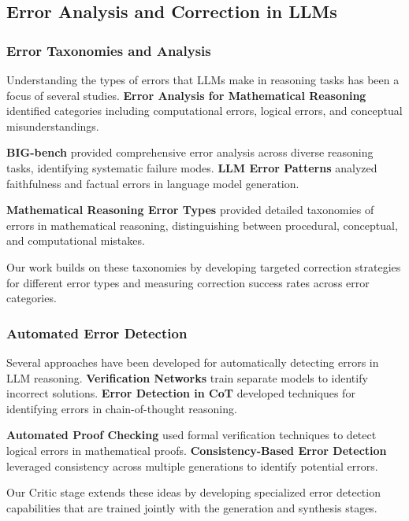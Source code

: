 \documentclass[10pt,twocolumn]{article}
\begin{document}
\subsection{Error Analysis and Correction in LLMs}

\subsubsection{Error Taxonomies and Analysis}

Understanding the types of errors that LLMs make in reasoning tasks has been a focus of several studies. \textbf{Error Analysis for Mathematical Reasoning} \cite{wells2021error} identified categories including computational errors, logical errors, and conceptual misunderstandings.

\textbf{BIG-bench} \cite{srivastava2022beyond} provided comprehensive error analysis across diverse reasoning tasks, identifying systematic failure modes. \textbf{LLM Error Patterns} \cite{dziri2023faith} analyzed faithfulness and factual errors in language model generation.

\textbf{Mathematical Reasoning Error Types} \cite{frieder2023mathematical} provided detailed taxonomies of errors in mathematical reasoning, distinguishing between procedural, conceptual, and computational mistakes.

Our work builds on these taxonomies by developing targeted correction strategies for different error types and measuring correction success rates across error categories.

\subsubsection{Automated Error Detection}

Several approaches have been developed for automatically detecting errors in LLM reasoning. \textbf{Verification Networks} \cite{cobbe2021training} train separate models to identify incorrect solutions. \textbf{Error Detection in CoT} \cite{kim2023error} developed techniques for identifying errors in chain-of-thought reasoning.

\textbf{Automated Proof Checking} \cite{welleck2022naturalproofs} used formal verification techniques to detect logical errors in mathematical proofs. \textbf{Consistency-Based Error Detection} \cite{mitchell2022consistency} leveraged consistency across multiple generations to identify potential errors.

Our Critic stage extends these ideas by developing specialized error detection capabilities that are trained jointly with the generation and synthesis stages.
\end{document}
